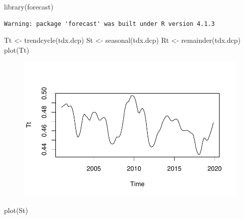 \documentclass[
  letterpaper,
  DIV=11,
  numbers=noendperiod]{scrartcl}
\newenvironment{Shaded}{\begin{snugshade}}{\end{snugshade}}
\newcommand{\FunctionTok}[1]{\textcolor[rgb]{0.28,0.35,0.67}{#1}}
\newcommand{\NormalTok}[1]{\textcolor[rgb]{0.00,0.23,0.31}{#1}}
\newcommand{\OtherTok}[1]{\textcolor[rgb]{0.00,0.23,0.31}{#1}}
\begin{document}
\begin{Shaded}
\begin{Highlighting}[]
\FunctionTok{library}\NormalTok{(forecast)}
\end{Highlighting}
\end{Shaded}

\begin{verbatim}
Warning: package 'forecast' was built under R version 4.1.3
\end{verbatim}

\begin{Shaded}
\begin{Highlighting}[]
\NormalTok{Tt }\OtherTok{\textless{}{-}} \FunctionTok{trendcycle}\NormalTok{(tdx.dcp)}
\NormalTok{St }\OtherTok{\textless{}{-}} \FunctionTok{seasonal}\NormalTok{(tdx.dcp)}
\NormalTok{Rt }\OtherTok{\textless{}{-}} \FunctionTok{remainder}\NormalTok{(tdx.dcp)}
\FunctionTok{plot}\NormalTok{(Tt)}
\end{Highlighting}
\end{Shaded}

\begin{figure}[H]

{\centering \includegraphics{Quarto_files/figure-pdf/unnamed-chunk-15-1.pdf}

}

\end{figure}

\begin{Shaded}
\begin{Highlighting}[]
\FunctionTok{plot}\NormalTok{(St)}
\end{Highlighting}
\end{Shaded}
\end{document}
